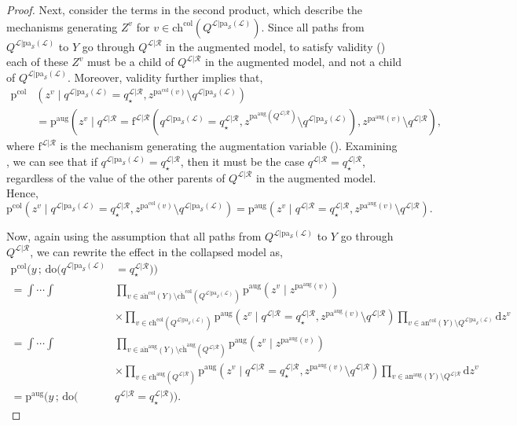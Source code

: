 \documentclass[12pt]{article}
\newcommand{\Sc}{\mathcal{S}}
\newcommand{\rmdo}{\mathrm{do}}
\newcommand{\s}{\, ; \,}
\newcommand{\di}{\mathrm{d}}
\newcommand{\pa}{\mathrm{pa}}
\newcommand{\pr}{\mathrm{p}}
\newcommand{\f}{\mathrm{f}}
\newcommand{\col}{\mathrm{col}}
\newcommand{\aug}{\mathrm{aug}}
\newcommand{\QLR}{Q^{\mathcal{L}|\mathcal{R}}}
\newcommand{\QLp}{Q^{\mathcal{L}|\pa_\Sc(\mathcal{L})}}
\newcommand{\qLR}{q^{\mathcal{L}|\mathcal{R}}}
\newcommand{\qLp}{q^{\mathcal{L}|\pa_\Sc(\mathcal{L})}}
\newcommand{\fLR}{\f^{\mathcal{L}|\mathcal{R}}}
\newcommand{\qsLR}{q_\star^{\mathcal{L}|\mathcal{R}}}
\newcommand{\an}{\mathrm{an}}
\newcommand{\ch}{\mathrm{ch}}
\begin{document}
\begin{proof}
Next, consider the terms in the second product, which describe the mechanisms generating $Z^v$ for $v \in \ch^\col(\QLp)$. 
Since all paths from $\QLp$ to $Y$ go through $\QLR$ in the augmented model, to satisfy validity () each of these $Z^v$ must be a child of $\QLR$ in the augmented model, and not a child of $\QLp$.
Moreover, validity further implies that, 
\begin{equation*}
\begin{split}
	\pr^\col & (z^v \mid \qLp = \qsLR, z^{\pa^\col(v)}\setminus \qLp)\\ & = \pr^\aug(z^v \mid \qLR=\fLR(\qLp = \qsLR, z^{\pa^\aug(\QLR)} \setminus \qLp), z^{\pa^\aug(v)}\setminus \qLR),
\end{split}
\end{equation*}
where $\fLR$ is the mechanism generating the augmentation variable ().
Examining , we can see that if $\qLp = \qsLR$, then it must be the case $\qLR=\qsLR$, regardless of the value of the other parents of $\QLR$ in the augmented model.
Hence,
\begin{equation}
	\pr^\col(z^v \mid \qLp = \qsLR, z^{\pa^\col(v)}\setminus \qLp) = \pr^\aug(z^v \mid \qLR =\qsLR, z^{\pa^\aug(v)}\setminus \qLR).
\end{equation}

Now, again using the assumption that all paths from $\QLp$ to $Y$ go through $\QLR$, we can rewrite the effect in the collapsed model as,
\begin{equation*}
\begin{split}
	\pr^\col (y \s \rmdo( \qLp & = \qsLR))\\ = \int \cdots \int & \prod_{v \in \overline{\an}^\col(Y) \setminus \overline{\ch}^\col(\QLp)} \pr^\aug(z^v \mid z^{\pa^\aug(v)})\\ & \times \prod_{v \in \ch^\col(\QLp)} \pr^\aug(z^v \mid \qLR =\qsLR, z^{\pa^\aug(v)}\setminus \qLR) \prod_{v \in \an^\col(Y) \setminus \QLp} \di z^v\\
	=\int \cdots \int & \prod_{v \in \overline{\an}^\aug(Y) \setminus \overline{\ch}^\aug(\QLR)} \pr^\aug(z^v \mid z^{\pa^\aug(v)})\\ & \times \prod_{v \in \ch^\aug(\QLR)} \pr^\aug(z^v \mid \qLR =\qsLR, z^{\pa^\aug(v)}\setminus \qLR) \prod_{v \in \an^\aug(Y) \setminus \QLR} \di z^v\\
	=\pr^\aug(y \s \rmdo(&\qLR = \qsLR)).
\end{split}
\end{equation*}
\end{proof}
  
\end{document}
